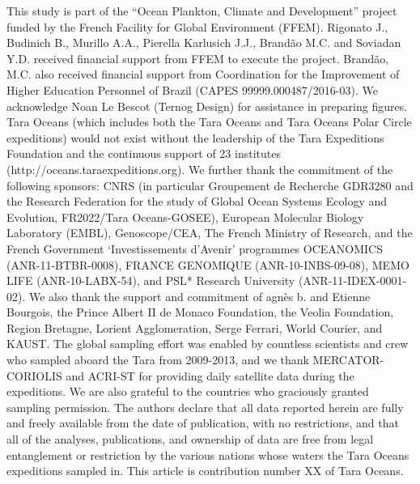 \documentclass[fleqn,10pt]{wlscirep}
\begin{document}
This study is part of the “Ocean Plankton, Climate and Development” project funded by the French Facility for Global Environment (FFEM). Rigonato J., Budinich B., Murillo A.A., Pierella Karlusich J.J., Brandão M.C. and Soviadan Y.D. received financial support from FFEM to execute the project. Brandão, M.C. also received financial support from Coordination for the Improvement of Higher Education Personnel of Brazil (CAPES 99999.000487/2016-03). We acknowledge Noan Le Bescot (Ternog Design) for assistance in preparing figures. Tara Oceans (which includes both the Tara Oceans and Tara Oceans Polar Circle expeditions) would not exist without the leadership of the Tara Expeditions Foundation and the continuous support of 23 institutes (http://oceans.taraexpeditions.org). We further thank the commitment of the following sponsors: CNRS (in particular Groupement de Recherche GDR3280 and the Research Federation for the study of Global Ocean Systems Ecology and Evolution, FR2022/Tara Oceans-GOSEE), European Molecular Biology Laboratory (EMBL), Genoscope/CEA, The French Ministry of Research, and the French Government ‘Investissements d’Avenir’ programmes OCEANOMICS (ANR-11-BTBR-0008), FRANCE GENOMIQUE (ANR-10-INBS-09-08), MEMO LIFE (ANR-10-LABX-54), and PSL* Research University (ANR-11-IDEX-0001-02). We also thank the support and commitment of agnès b. and Etienne Bourgois, the Prince Albert II de Monaco Foundation, the Veolia Foundation, Region Bretagne, Lorient Agglomeration, Serge Ferrari, World Courier, and KAUST. The global sampling effort was enabled by countless scientists and crew who sampled aboard the Tara from 2009-2013, and we thank MERCATOR-CORIOLIS and ACRI-ST for providing daily satellite data during the expeditions. We are also grateful to the countries who graciously granted sampling permission. The authors declare that all data reported herein are fully and freely available from the date of publication, with no restrictions, and that all of the analyses, publications, and ownership of data are free from legal entanglement or restriction by the various nations whose waters the Tara Oceans expeditions sampled in. This article is contribution number XX of Tara Oceans.




\end{document}
